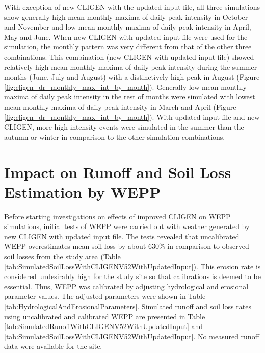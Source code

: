 With exception of new CLIGEN with the updated input file, all three simulations
show generally high mean monthly maxima of daily peak intensity in October and
November and low mean monthly maxima of daily peak intensity in April, May and
June. When new CLIGEN with updated input file were used for the simulation, the
monthly pattern was very different from that of the other three combinations.
This combination (new CLIGEN with updated input file) showed relatively high
mean monthly maxima of daily peak intensity during the summer months (June, July
and August) with a distinctively high peak in August (Figure
\ref{fig:cligen_dr_monthly_max_int_by_month}). Generally low mean monthly maxima
of daily peak intensity in the rest of months were simulated with lowest mean
monthly maxima of daily peak intensity in March and April (Figure
\ref{fig:cligen_dr_monthly_max_int_by_month}). With updated input file and new
CLIGEN, more high intensity events were simulated in the summer than the autumn
or winter in comparison to the other simulation combinations.

\section{Impact on Runoff and Soil Loss Estimation by WEPP}
\label{sec:RunoffAndSoilLossSimulation}
Before starting investigations on effects of improved CLIGEN on WEPP
simulations, initial tests of WEPP were carried out with weather generated by
new CLIGEN with updated input file. The tests revealed that uncalibrated WEPP
overestimates mean soil loss by about 630\% in comparison to observed soil
losses from the study area (Table
\ref{tab:SimulatedSoilLossWithCLIGENV52WithUpdatedInput}). This erosion rate is
considered undesirably high for the study site so that calibrations is
deemed to be essential. Thus, WEPP was calibrated by adjusting hydrological and
erosional parameter values. The adjusted parameters were shown in Table
\ref{tab:HydrologicalAndErosionalParameters}. Simulated runoff and soil loss
rates using uncalibrated and calibrated WEPP are presented in Table
\ref{tab:SimulatedRunoffWithCLIGENV52WithUpdatedInput} and
\ref{tab:SimulatedSoilLossWithCLIGENV52WithUpdatedInput}. No measured runoff
data were available for the site.

